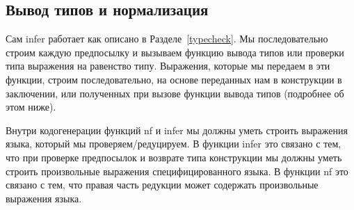 \pagebreak
\subsection{Вывод типов и нормализация}\label{nf_infer}
Сам infer работает как описано в Разделе~\ref{typecheck}. Мы последовательно строим каждую предпосылку и вызываем функцию вывода типов или проверки типа выражения на равенство типу. Выражения, которые мы передаем в эти функции, строим последовательно, на основе переданных нам в конструкции в заключении, или полученных при вызове функции вывода типов (подробнее об этом ниже).

Внутри кодогенерации функций nf и infer мы должны уметь строить выражения языка, который мы проверяем/редуцируем. В функции infer это связано с тем, что при проверке предпосылок и возврате типа конструкции мы должны уметь строить произвольные выражения специфицированного языка. В функции nf это связано с тем, что правая часть редукции может содержать произвольные выражения языка.



